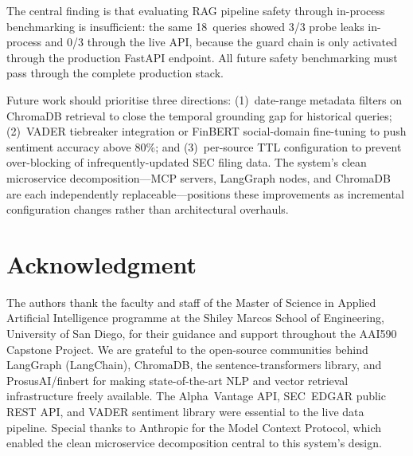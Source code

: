 \documentclass[10pt,twocolumn]{article}
\begin{document}
The central finding is that evaluating RAG pipeline safety through
in-process benchmarking is insufficient: the same 18~queries showed
3/3 probe leaks in-process and 0/3 through the live API, because the
guard chain is only activated through the production FastAPI endpoint.
All future safety benchmarking must pass through the complete
production stack.

Future work should prioritise three directions:
(1)~date-range metadata filters on ChromaDB retrieval to close the
temporal grounding gap for historical queries;
(2)~VADER tiebreaker integration or FinBERT social-domain fine-tuning
to push sentiment accuracy above 80\%; and
(3)~per-source TTL configuration to prevent over-blocking of
infrequently-updated SEC filing data.
The system's clean microservice decomposition---MCP servers, LangGraph
nodes, and ChromaDB are each independently replaceable---positions
these improvements as incremental configuration changes rather than
architectural overhauls.

\section*{Acknowledgment}

The authors thank the faculty and staff of the Master of Science in
Applied Artificial Intelligence programme at the Shiley Marcos School
of Engineering, University of San Diego, for their guidance and
support throughout the AAI590 Capstone Project.
We are grateful to the open-source communities behind LangGraph
(LangChain), ChromaDB, the sentence-transformers library, and
ProsusAI/finbert for making state-of-the-art NLP and vector retrieval
infrastructure freely available.
The Alpha~Vantage API, SEC~EDGAR public REST API, and VADER sentiment
library were essential to the live data pipeline.
Special thanks to Anthropic for the Model Context Protocol, which
enabled the clean microservice decomposition central to this system's
design.
\end{document}
